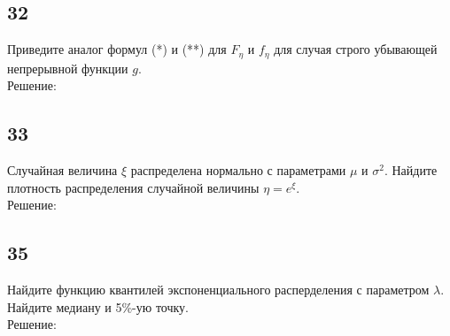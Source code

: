 \documentclass[a4paper, 12pt]{extarticle}
\numberwithin{figure}{section}
\begin{document}
\subsection*{32}
Приведите аналог формул (*) и (**) для $F_\eta$ и $f_\eta$ для случая строго убывающей непрерывной функции $g$.\\

Решение:\\

\subsection*{33}
Случайная величина $\xi$ распределена нормально с параметрами $\mu$ и $\sigma^2$. Найдите плотность распределения случайной величины $\eta = e^\xi$.\\

Решение:\\

\subsection*{35}
Найдите функцию квантилей экспоненциального расперделения с параметром $\lambda$.\\
Найдите медиану и 5\%-ую точку.\\

Решение:\\
\end{document}
